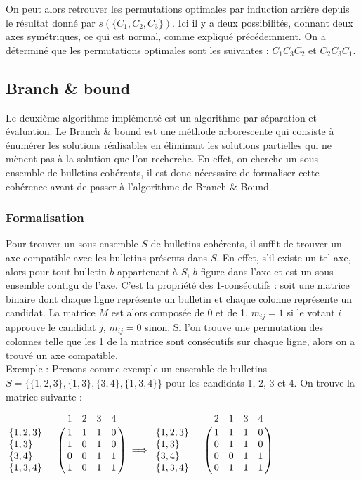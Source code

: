\documentclass[11pt, a4paper]{article}
\begin{document}
\bigskip
On peut alors retrouver les permutations optimales par induction arrière depuis le résultat donné par $s(\{C_1,C_2,C_3\})$. Ici il y a deux possibilités, donnant deux axes symétriques, ce qui est normal, comme expliqué précédemment. On a déterminé que les permutations optimales sont les suivantes : $C_1C_3C_2$ et $C_2C_3C_1$.

\subsection{Branch \& bound}

Le deuxi\`{e}me algorithme impl\'{e}ment\'{e} est un algorithme par s\'{e}paration et \'{e}valuation. Le Branch \& bound est une m\'{e}thode arborescente qui consiste \`{a} \'{e}num\'{e}rer les solutions r\'{e}alisables en \'{e}liminant les solutions partielles qui ne m\`{e}nent pas \`{a} la solution que l'on recherche. En effet, on cherche un sous-ensemble de bulletins coh\'{e}rents, il est donc n\'{e}cessaire de formaliser cette coh\'{e}rence avant de passer \`{a} l'algorithme de Branch \& Bound.

\subsubsection{Formalisation}
\label{1consecutifs}

Pour trouver un sous-ensemble $S$ de bulletins coh\'{e}rents, il suffit de trouver un axe compatible avec les bulletins pr\'{e}sents dans $S$. En effet, s'il existe un tel axe, alors pour tout bulletin $b$ appartenant à $S$, $b$ figure dans l'axe et est un sous-ensemble contigu de l'axe. C'est la propri\'{e}t\'{e} des 1-cons\'{e}cutifs : soit une matrice binaire dont chaque ligne repr\'{e}sente un bulletin et chaque colonne repr\'{e}sente un candidat. La matrice $M$ est alors compos\'{e}e de 0 et de 1, $m_{ij} = 1$ si le votant $i$ approuve le candidat $j$, $m_{ij} = 0$ sinon. Si l'on trouve une permutation des colonnes telle que les 1 de la matrice sont cons\'{e}cutifs sur chaque ligne, alors on a trouv\'{e} un axe compatible.\\

Exemple : Prenons comme exemple un ensemble de bulletins $S = \{\{1,2,3\},\{1,3\},\{3,4\}, \{1,3,4\}$\} pour les candidats 1, 2, 3 et 4. On trouve la matrice suivante :\\

\begin{center}
$\bordermatrix{
& 1 & 2 & 3 & 4 \cr
\{1,2, 3\} ~~~~ & 1 & 1 & 1 & 0 \cr
\{1,3\} & 1 & 0 & 1 & 0 \cr
\{3,4\} & 0 & 0 & 1 & 1 \cr
\{1,3,4\} & 1 & 0 & 1 & 1}
%
\implies
%
\bordermatrix{
& 2 & 1 & 3 & 4 \cr
\{1,2, 3\} ~~~~ & 1 & 1 & 1 & 0 \cr
\{1,3\} & 0 & 1 & 1 & 0 \cr
\{3,4\} & 0 & 0 & 1 & 1 \cr
\{1,3,4\} & 0 & 1 & 1 & 1}$\\[0.8cm]
\end{center}
\end{document}
